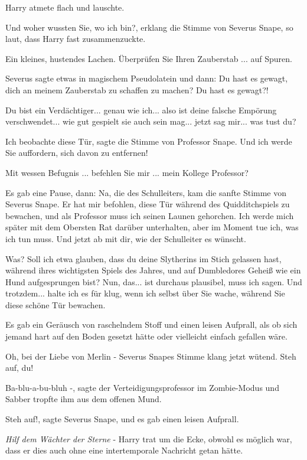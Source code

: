 Harry atmete flach und lauschte.

\glqq{}Und woher wussten Sie, wo ich bin?\grqq{}, erklang die Stimme von Severus
Snape, so laut, dass Harry fast zusammenzuckte.

Ein kleines, hustendes Lachen. \glqq{}Überprüfen Sie Ihren Zauberstab ... auf
Spuren.\grqq{}

Severus sagte etwas in magischem Pseudolatein und dann: \glqq{}Du hast es gewagt,
dich an meinem Zauberstab zu schaffen zu machen? Du hast es gewagt?!\grqq{}

\glqq{}Du bist ein Verdächtiger... genau wie ich... also ist deine falsche
Empörung verschwendet... wie gut gespielt sie auch sein mag... jetzt sag mir...
was tust du?\grqq{}

\glqq{}Ich beobachte diese Tür\grqq{}, sagte die Stimme von Professor Snape.
\glqq{}Und ich werde Sie auffordern, sich davon zu entfernen!\grqq{}

\glqq{}Mit wessen Befugnis ... befehlen Sie mir ... mein Kollege Professor?\grqq{}

Es gab eine Pause, dann: \glqq{}Na, die des Schulleiters\grqq{}, kam die sanfte
Stimme von Severus Snape. \glqq{}Er hat mir befohlen, diese Tür während des
Quidditchspiels zu bewachen, und als Professor muss ich seinen Launen gehorchen.
Ich werde mich später mit dem Obersten Rat darüber unterhalten, aber im Moment
tue ich, was ich tun muss. Und jetzt ab mit dir, wie der Schulleiter es
wünscht.\grqq{}

\glqq{}Was? Soll ich etwa glauben, dass du deine Slytherins im Stich gelassen
hast, während ihres wichtigsten Spiels des Jahres, und auf Dumbledores Geheiß
wie ein Hund aufgesprungen bist? Nun, das... ist durchaus plausibel, muss ich
sagen. Und trotzdem... halte ich es für klug, wenn ich selbst über Sie wache,
während Sie diese schöne Tür bewachen.\grqq{}

Es gab ein Geräusch von raschelndem Stoff und einen leisen Aufprall, als ob sich
jemand hart auf den Boden gesetzt hätte oder vielleicht einfach gefallen wäre.

\glqq{}Oh, bei der Liebe von Merlin -\grqq{} Severus Snapes Stimme klang jetzt
wütend. \glqq{}Steh auf, du!\grqq{}

\glqq{}Ba-blu-a-bu-bluh -\grqq{}, sagte der Verteidigungsprofessor im
Zombie-Modus und Sabber tropfte ihm aus dem offenen Mund.

\glqq{}Steh auf!\grqq{}, sagte Severus Snape, und es gab einen leisen Aufprall.

\emph{Hilf dem Wächter der Sterne} - Harry trat um die Ecke, obwohl es möglich
war, dass er dies auch ohne eine intertemporale Nachricht getan hätte.

